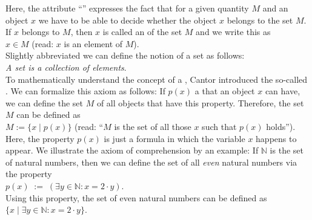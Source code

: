 \noindent
Here, the attribute ``'' expresses the fact that for a given quantity $M$ and an object $x$ we have
to be able to decide whether the object $x$ belongs to the set $M$.  If $x$ belongs to $M$, then $x$ is called an
 of the set $M$ and we write this as
\\[0.2cm]
\hspace*{1.3cm}
$x \in M$ \quad (read: $x$ is an element of $M$). 
\\[0.2cm]
Slightly abbreviated we can define the notion of a set as follows: 
\\[0.2cm]
\hspace*{1.3cm}
\textsl{A set is a  collection of elements}.
\\[0.2cm]
To mathematically understand the concept of a ,
Cantor introduced the so-called  .
We can formalize this axiom as follows:  If $p(x)$ a  that
an object $x$ can have, we can define the set $M$ of all objects that have this
property.  Therefore, the set $M$ can be defined as 
\\[0.2cm]
\hspace*{1.3cm} 
$M := \{ x \;|\; p(x) \}$ \quad (read: ``$M$ is the set of all those $x$ such that $p(x)$ holds'').
\\[0.2cm]
Here, the property $p(x)$ is just a formula in which the variable $x$ happens to appear.
We illustrate the axiom of comprehension by an example: If $\mathbb{N}$ is
the set of natural numbers, then we can define the set of all \emph{even} natural numbers
via the property \\[0.2cm]
\hspace*{1.3cm} $p(x) \;:=\; (\exists y\in \mathbb{N}: x = 2 \cdot y)$. \\[0.2cm]
Using this property, the set of even natural numbers can be defined as \\[0.2cm]
\hspace*{1.3cm} $\{ x \;|\; \exists y\in \mathbb{N}: x = 2 \cdot y \}$. 

